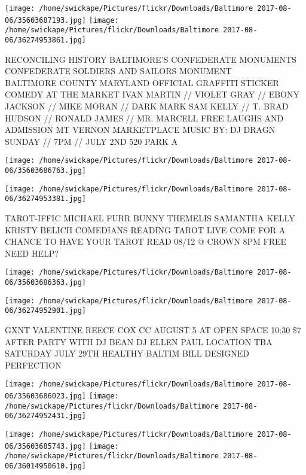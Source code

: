 \documentclass[10pt,letterpaper]{article}
\begin{document}
\vspace{0.25in}
\texttt{[image: /home/swickape/Pictures/flickr/Downloads/Baltimore 2017-08-06/35603687193.jpg]}
\texttt{[image: /home/swickape/Pictures/flickr/Downloads/Baltimore 2017-08-06/36274953861.jpg]}

RECONCILING HISTORY BALTIMORE'S CONFEDERATE MONUMENTS CONFEDERATE SOLDIERS AND SAILORS MONUMENT\\
BALTIMORE COUNTY MARYLAND OFFICIAL GRAFFITI STICKER\\
COMEDY AT THE MARKET IVAN MARTIN // VIOLET GRAY  // EBONY JACKSON // MIKE MORAN // DARK MARK SAM KELLY // T. BRAD HUDSON // RONALD JAMES // MR. MARCELL FREE LAUGHS AND ADMISSION MT VERNON MARKETPLACE MUSIC BY: DJ DRAGN SUNDAY // 7PM // JULY 2ND 520 PARK A
\pagebreak

\texttt{[image: /home/swickape/Pictures/flickr/Downloads/Baltimore 2017-08-06/35603686763.jpg]}

\vspace{0.25in}
\texttt{[image: /home/swickape/Pictures/flickr/Downloads/Baltimore 2017-08-06/36274953381.jpg]}

TAROT{-}IFFIC MICHAEL FURR BUNNY THEMELIS SAMANTHA KELLY KRISTY BELICH COMEDIANS READING TAROT LIVE COME FOR A CHANCE TO HAVE YOUR TAROT READ 08/12 @ CROWN 8PM FREE\\
NEED HELP?
\pagebreak

\texttt{[image: /home/swickape/Pictures/flickr/Downloads/Baltimore 2017-08-06/35603686363.jpg]}

\vspace{0.25in}
\texttt{[image: /home/swickape/Pictures/flickr/Downloads/Baltimore 2017-08-06/36274952901.jpg]}

GXNT VALENTINE REECE COX CC AUGUST 5 AT OPEN SPACE 10:30 \$7 AFTER PARTY WITH DJ BEAN DJ ELLEN PAUL LOCATION TBA\\
SATURDAY JULY 29TH HEALTHY BALTIM BILL DESIGNED PERFECTION
\pagebreak

\texttt{[image: /home/swickape/Pictures/flickr/Downloads/Baltimore 2017-08-06/35603686023.jpg]}
\texttt{[image: /home/swickape/Pictures/flickr/Downloads/Baltimore 2017-08-06/36274952431.jpg]}

\texttt{[image: /home/swickape/Pictures/flickr/Downloads/Baltimore 2017-08-06/35603685743.jpg]}
\texttt{[image: /home/swickape/Pictures/flickr/Downloads/Baltimore 2017-08-06/36014950610.jpg]}
\end{document}
